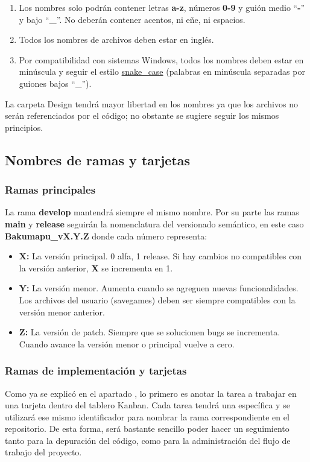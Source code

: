 \begin{enumerate}
  \item Los nombres solo podrán contener letras \textbf{a-z}, números \textbf{0-9} y guión medio “\textbf{-}” y bajo “\textbf{\_}”. No deberán contener acentos, ni eñe, ni espacios.
  
  \item Todos los nombres de archivos deben estar en inglés.
  
  \item Por compatibilidad con sistemas Windows, todos los nombres deben estar en minúscula y seguir el estilo \href{https://en.wikipedia.org/wiki/Snake_case}{snake\_case} (palabras en minúscula separadas por guiones bajos “\_”).
\end{enumerate}

La carpeta Design tendrá mayor libertad en los nombres ya que los archivos no serán referenciados por el código; no obstante se sugiere seguir los mismos principios.

\subsection{Nombres de ramas y tarjetas}\label{organizacion:nombres-de-ramas}

\subsubsection{Ramas principales}\label{organizacion:ramas-principales}
La rama \textbf{develop} mantendrá siempre el mismo nombre. Por su parte las ramas \textbf{main} y \textbf{release} seguirán la nomenclatura del versionado semántico, en este caso \textbf{Bakumapu\_vX.Y.Z} donde cada número representa:
\begin{itemize}[label=-]
	\item \textbf{X:} La versión principal. 0 alfa, 1 release. Si hay cambios no compatibles con la versión anterior, \textbf{X} se incrementa en 1.
	\item \textbf{Y:} La versión menor. Aumenta cuando se agreguen nuevas funcionalidades. Los archivos del usuario (savegames) deben ser siempre compatibles con la versión menor anterior.
	\item \textbf{Z:} La versión de patch. Siempre que se solucionen bugs se incrementa. Cuando avance la versión menor o principal vuelve a cero.
\end{itemize}

\subsubsection{Ramas de implementación y tarjetas}\label{organizacion:id-ramas-tarjetas}
Como ya se explicó en el apartado , lo primero es anotar la tarea a trabajar en una tarjeta dentro del tablero Kanban. Cada tarea tendrá una  específica y se utilizará ese mismo identificador para nombrar la rama correspondiente en el repositorio. De esta forma, será bastante sencillo poder hacer un seguimiento tanto para la depuración del código, como para la administración del flujo de trabajo del proyecto.

